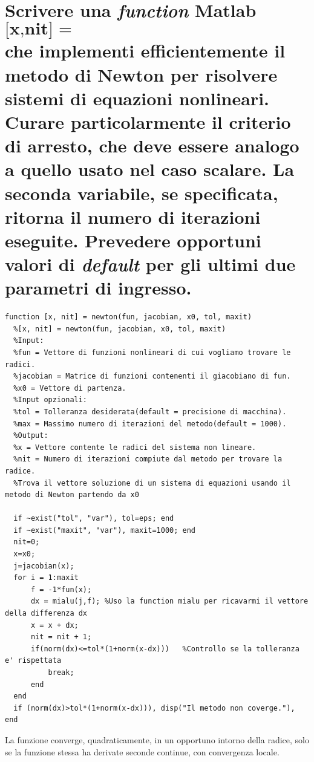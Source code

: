 \documentclass[10pt,a4paper]{article}
\begin{document}
\section{Scrivere una \textit{function} Matlab
  $$ \textbf{[x,nit] = newton(fun,jacobian,x0,tol,maxit)} $$
  che implementi efficientemente il metodo di Newton per risolvere sistemi di
  equazioni nonlineari. Curare particolarmente il criterio di arresto, che deve essere
  analogo a quello usato nel caso scalare.
  La seconda variabile, se specificata, ritorna il numero di iterazioni eseguite.
  Prevedere opportuni valori di \textit{default} per gli ultimi due parametri
  di ingresso.}
\begin{lstlisting}[style=Matlab-editor]
  function [x, nit] = newton(fun, jacobian, x0, tol, maxit)
  %[x, nit] = newton(fun, jacobian, x0, tol, maxit)
  %Input: 
  %fun = Vettore di funzioni nonlineari di cui vogliamo trovare le radici.
  %jacobian = Matrice di funzioni contenenti il giacobiano di fun. 
  %x0 = Vettore di partenza.
  %Input opzionali:
  %tol = Tolleranza desiderata(default = precisione di macchina).
  %max = Massimo numero di iterazioni del metodo(default = 1000).
  %Output:
  %x = Vettore contente le radici del sistema non lineare.
  %nit = Numero di iterazioni compiute dal metodo per trovare la radice.
  %Trova il vettore soluzione di un sistema di equazioni usando il metodo di Newton partendo da x0
  
  if ~exist("tol", "var"), tol=eps; end 
  if ~exist("maxit", "var"), maxit=1000; end
  nit=0;
  x=x0;
  j=jacobian(x);
  for i = 1:maxit
      f = -1*fun(x);
      dx = mialu(j,f); %Uso la function mialu per ricavarmi il vettore della differenza dx
      x = x + dx;
      nit = nit + 1;
      if(norm(dx)<=tol*(1+norm(x-dx)))   %Controllo se la tolleranza e' rispettata
          break;
      end
  end
  if (norm(dx)>tol*(1+norm(x-dx))), disp("Il metodo non coverge."), end
\end{lstlisting}

La funzione converge, quadraticamente, in un opportuno intorno della radice, solo se la funzione stessa ha derivate seconde continue,
con convergenza locale.
\end{document}
